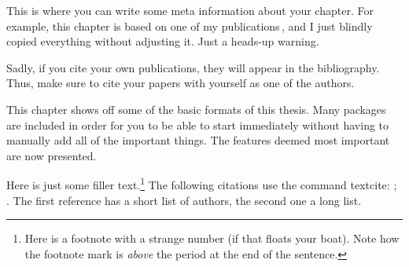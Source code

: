 \begin{jointwork}
    This is where you can write some meta information about your chapter. For example, this chapter is based on one of my publications\,\cite{firstDemoReference}, and I just blindly copied everything without adjusting it. Just a heads-up warning.
    
    Sadly, if you cite your own publications, they will appear in the bibliography. Thus, make sure to cite your papers with yourself as one of the authors.
\end{jointwork}

This chapter shows off some of the basic formats of this thesis. Many packages are included in order for you to be able to start immediately without having to manually add all of the important things. The features deemed most important are now presented.

Here is just some filler text.\footnote[-0.2][][15]{Here is a footnote with a strange number (if that floats your boat). Note how the footnote mark is \emph{above} the period at the end of the sentence.} The following citations use the command \textsf{textcite}: \textcite{firstDemoReference}; \textcite{secondDemoReference}. The first reference has a short list of authors, the second one a long list.

